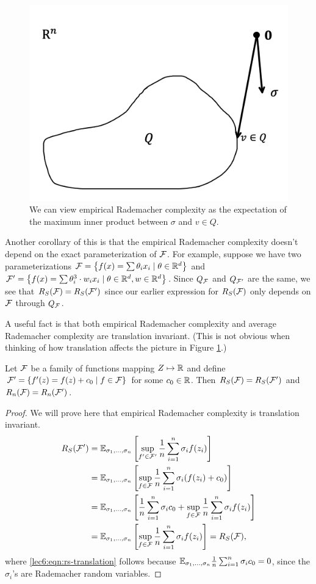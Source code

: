 \begin{figure}[ht!]
\begin{center}
\includegraphics[width=.5\textwidth]{figures/remark2.png}
\end{center}
\caption{We can view empirical Rademacher complexity as the expectation of the maximum inner product between $\sigma$ and $v\in Q$.}
\label{lec6:fig:rs-innerprod}
\end{figure}

Another corollary of this is that the empirical Rademacher complexity doesn't depend on the exact parameterization of $\mathcal F$. For example, suppose we have two parameterizations $\mathcal F = \left\{f(x)=\sum \theta_{i} x_{i} \mid \theta \in \mathbb{R}^{d}\right\}$ and $\mathcal F' = \left\{f(x)=\sum \theta_{i}^{3} \cdot w_{i} x_{i} \mid \theta \in \mathbb R^{d}, w \in \mathbb{R}^{d}\right\}$. Since $Q_\mathcal F$ and $Q_{\mathcal F'}$ are the same, we see that $R_S(\mathcal F) = R_S(\mathcal F')$ since our earlier expression for $R_S(\mathcal F)$ only depends on $\mathcal F$ through $Q_\mathcal F$. 

A useful fact is that both empirical Rademacher complexity and average Rademacher complexity are translation invariant. (This is not obvious when thinking of how translation affects the picture in Figure \ref{lec6:fig:rs-innerprod}.)

\begin{proposition}
Let $\mathcal F$ be a family of functions mapping $Z \mapsto \mathbb R$ and define $\mathcal F' = \{f'(z) = f(z) + c_0\mid f\in \mathcal F\}$ for some $c_0\in\mathbb R$. Then $R_S(\mathcal F) = R_S(\mathcal F')$ and $R_n(\mathcal F) = R_n(\mathcal F')$.
\end{proposition}

\begin{proof}
We will prove here that empirical Rademacher complexity is translation invariant.
\begin{align}
R_S(\mathcal F') &= \mathbb{E}_{\sigma_1,\dots, \sigma_n} \left[ \sup_{f'\in \mathcal F'} \frac{1}{n} \sum^n_{i=1} \sigma_i f(z_i) \right] \\
&= \mathbb{E}_{\sigma_1,\dots, \sigma_n} \left[ \sup_{f\in \mathcal F} \frac{1}{n} \sum^n_{i=1} \sigma_i (f(z_i)+c_0) \right] \\
&= \mathbb{E}_{\sigma_1,\dots, \sigma_n} \left[ \frac{1}{n} \sum^n_{i=1} \sigma_i c_0 + \sup_{f\in \mathcal F} \frac{1}{n} \sum^n_{i=1} \sigma_i f(z_i) \right] \\
&= \mathbb{E}_{\sigma_1,\dots, \sigma_n} \left[\sup_{f\in \mathcal F} \frac{1}{n} \sum^n_{i=1} \sigma_i f(z_i) \right] = R_S(\mathcal F), \label{lec6:eqn:rs-translation}
\end{align}
where \eqref{lec6:eqn:rs-translation} follows because $\mathbb{E}_{\sigma_1,\dots,\sigma_n} \frac{1}{n}\sum_{i=1}^n \sigma_i c_0 = 0$, since the $\sigma_i$'s are Rademacher random variables.
\end{proof}

